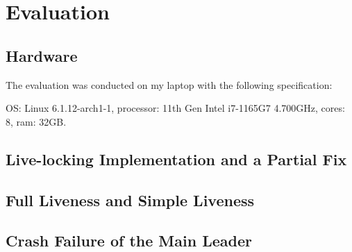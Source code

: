 \documentclass[11pt]{article}
\begin{document}
\section*{Evaluation}
\subsection*{Hardware}
The evaluation was conducted on my laptop with the following specification:

OS: Linux 6.1.12-arch1-1, processor: 11th Gen Intel i7-1165G7 4.700GHz, cores: 8, ram: 32GB.

\subsection*{Live-locking Implementation and a Partial Fix}
\subsection*{Full Liveness and Simple Liveness}
\subsection*{Crash Failure of the Main Leader}
\end{document}
